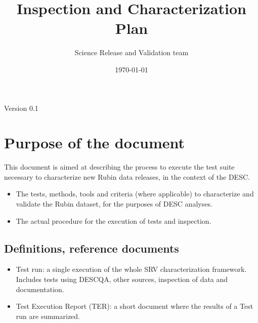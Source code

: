 \documentclass[12pt, a4paper]{article}
\title{Inspection and Characterization Plan} %
\author{Science Release and Validation team} %
\date{\today} %
\begin{document}
\maketitle %

\begin{center}
Version 0.1
\end{center}



\section{Purpose of the document}

This document is aimed at describing the process to execute the test suite necessary to characterize new Rubin data releases, in the context of the DESC.

\begin{itemize}
\item The tests, methods, tools and criteria (where applicable) to characterize and validate the Rubin dataset, for the purposes of DESC analyses.
\item The actual procedure for the execution of tests and inspection.
\end{itemize}


\subsection{Definitions, reference documents}

\begin{itemize}
\item Test run: a single execution of the whole SRV characterization framework. Includes tests using DESCQA, other sources, inspection of data and documentation.
\item Test Execution Report (TER): a short document where the results of a Test run are summarized.
\end{itemize}
 
\end{document}
